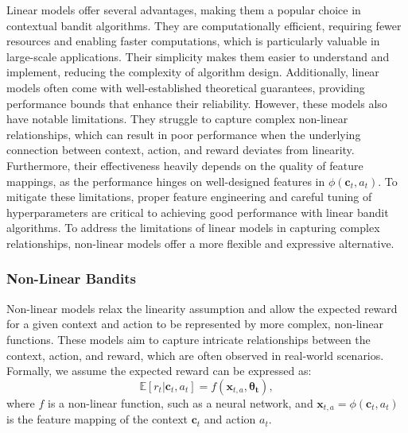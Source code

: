Linear models offer several advantages, making them a popular choice in contextual bandit algorithms. They are computationally efficient, requiring fewer resources and enabling faster computations, which is particularly valuable in large-scale applications. Their simplicity makes them easier to understand and implement, reducing the complexity of algorithm design. Additionally, linear models often come with well-established theoretical guarantees, providing performance bounds that enhance their reliability. However, these models also have notable limitations. They struggle to capture complex non-linear relationships, which can result in poor performance when the underlying connection between context, action, and reward deviates from linearity. Furthermore, their effectiveness heavily depends on the quality of feature mappings, as the performance hinges on well-designed features in $\phi(\mathbf{c}_t, a_t)$. To mitigate these limitations, proper feature engineering and careful tuning of hyperparameters are critical to achieving good performance with linear bandit algorithms.
To address the limitations of linear models in capturing complex relationships, non-linear models offer a more flexible and expressive alternative. 


\subsubsection{Non-Linear Bandits}
Non-linear models relax the linearity assumption and allow the expected reward for a given context and action to be represented by more complex, non-linear functions. These models aim to capture intricate relationships between the context, action, and reward, which are often observed in real-world scenarios. Formally, we assume the expected reward can be expressed as:
\begin{equation*}
    \mathbb{E}[r_t  \vert  \mathbf{c}_t, a_t] = f(\mathbf{x}_{t,a}, \boldsymbol{\theta_t}),
\end{equation*}
where $f$ is a non-linear function, such as a neural network, and $\mathbf{x}_{t,a}  = \phi(\mathbf{c}_t, a_t)$ is the feature mapping of the context $\mathbf{c}_t$ and action $a_t$.


